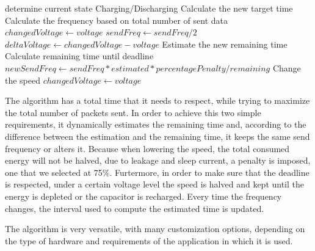 \lstset{numbers=none, mathescape=true, nolol=false,caption=Transfer speed scheduling algorithm,label=lst:alg}
\newcommand{\var}[1]{{\ttfamily#1}}%
\begin{algorithm}[t]

    \begin{lstlisting}
    \end{lstlisting}
  \begin{algorithmic}[1]

      \Comment{}
    \State determine current state Charging/Discharging
        \State Calculate the new target time
        \State Calculate the frequency based on total number of sent data
        \State $changedVoltage \gets voltage$
    \EndIf
        \State $sendFreq \gets sendFreq / 2$
    \EndIf
    \State $deltaVoltage \gets changedVoltage - voltage$
        \State Estimate the new remaining time
        \State Calculate remaining time until deadline
        \State $newSendFreq \gets sendFreq*estimated*percentagePenalty/remaining $
            \State Change the speed
            \State $changedVoltage \gets voltage$
        \EndIf
    \EndIf
    \EndIf
    \EndProcedure

\end{algorithmic}
\end{algorithm}


The algorithm has a total time that it needs to respect, while trying to maximize the total number
of packets sent. In order to achieve this two simple requirements, it dynamically estimates the
remaining time and, according to the difference between the estimation and the remaining time, it
keeps the same send frequency or alters it. Because when lowering the speed, the total consumed
energy will not be halved, due to leakage and sleep current, a penalty is imposed,
one that we selected at 75\%. Furtermore, in order to make sure that the deadline is respected,
under a certain voltage level the
speed is halved and kept until the energy is depleted or the capacitor is recharged. Every time the
frequency changes, the interval used to compute the estimated time is updated.

The algorithm is very versatile, with many customization options, depending on the type of hardware and
requirements of the application in which it is used.

